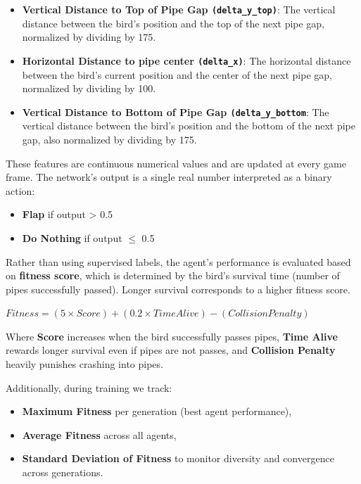 \documentclass[sigconf]{acmart}
\begin{document}
\begin{itemize}
    \item \textbf{Vertical Distance to Top of Pipe Gap \texttt{(delta\_y\_top)}}:
        The vertical distance between the bird's position and the top of the next pipe gap, normalized by dividing by 175.

    \item \textbf{Horizontal Distance to pipe center \texttt{(delta\_x)}}:
        The horizontal distance between the bird's current position and the center of the next pipe gap, normalized by dividing by 100.

    \item \textbf{Vertical Distance to Bottom of Pipe Gap \texttt{(delta\_y\_bottom}}:
        The vertical distance between the bird's position and the bottom of the next pipe gap, also normalized by dividing by 175.
\end{itemize}

These features are continuous numerical values and are updated at every game frame. The network's output is a single real number interpreted as a binary action:

\begin{itemize}
    \item  \textbf{Flap} if output > 0.5

    \item  \textbf{Do Nothing} if output $\leq$ 0.5
    
\end{itemize}

Rather than using supervised labels, the agent's performance is evaluated based on \textbf{fitness score}, which is determined by the bird's survival time (number of pipes successfully passed). Longer survival corresponds to a higher fitness score.

\begin{center}
    $Fitness = (5 \times Score) + (0.2 \times Time Alive) - (Collision Penalty)$
\end{center}

Where \textbf{Score} increases when the bird successfully passes pipes, \textbf{Time Alive} rewards longer survival even if pipes are not passes, and \textbf{Collision Penalty} heavily punishes crashing into pipes.

Additionally, during training we track:

\begin{itemize}
    \item \textbf{Maximum Fitness} per generation (best agent performance),

    \item \textbf{Average Fitness} across all agents,

    \item \textbf{Standard Deviation of Fitness} to monitor diversity and convergence across generations.
\end{itemize}
\end{document}
